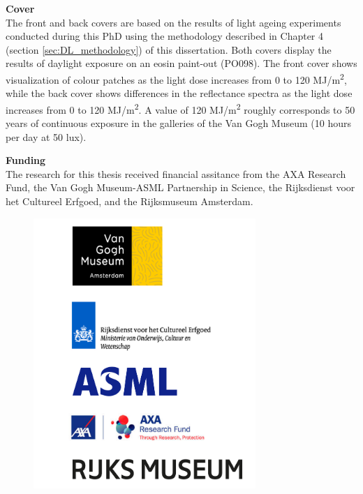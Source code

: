 \vspace{0.5cm}

\textbf{Cover} \\

The front and back covers are based on the results of light ageing experiments conducted during this PhD using the methodology described in Chapter 4 (section \ref{sec:DL_methodology}) of this dissertation. Both covers display the results of daylight exposure on an eosin paint-out (PO098). The front cover shows visualization of colour patches as the light dose increases from 0 to 120 MJ/m\textsuperscript{2}, while the back cover shows differences in the reflectance spectra as the light dose increases from 0 to 120 MJ/m\textsuperscript{2}. A value of 120 MJ/m\textsuperscript{2} roughly corresponds to 50 years of continuous exposure in the galleries of the Van Gogh Museum (10 hours per day at 50 lux).









\newpage
{\Large\textbf{Funding}}\\

The research for this thesis received financial assitance from the AXA Research Fund, the Van Gogh Museum-ASML Partnership in Science, the Rijksdienst voor het Cultureel Erfgoed, and the Rijksmuseum Amsterdam. 

\vspace{1.5cm}

\begin{figure}[!h]
\centering
\includegraphics[width=0.75\textwidth]{Logo_institutions.png}
\label{fig:colours_description}
\end{figure}

\newpage
\newpage
